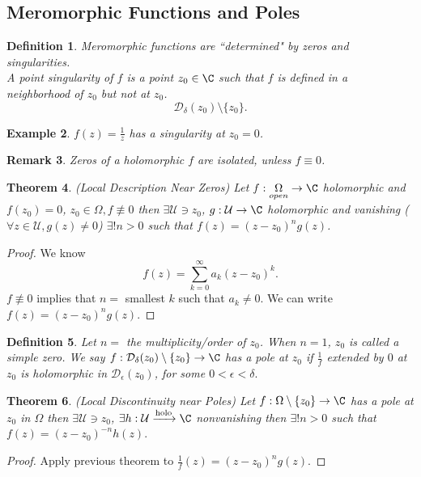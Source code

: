 \documentclass[a4paper]{article}
\newtheorem{thm}{Theorem}[section]
\newtheorem{defn}[thm]{Definition}
\newtheorem{eg}[thm]{Example}
\newtheorem{rmk}[thm]{Remark}
\begin{document}
\subsection{Meromorphic Functions and Poles}
\begin{defn}
    Meromorphic functions are ``determined" by zeros and singularities. \\
    A point singularity of $f$ is a point $z_0\in \C$ such that $f$ is defined in a neighborhood of $z_0$ but not at $z_0$. \[
    \mathcal{D}_\delta(z_0)\setminus \{z_0\}
    .\] 
\end{defn}
\begin{eg}
    $f(z)=\frac{1}{z}$ has a singularity at $z_0=0$.
\end{eg}
\begin{rmk}
    Zeros of a holomorphic $f$ are isolated, unless $f\equiv 0$.
\end{rmk}
\begin{thm}
    (Local Description Near Zeros) Let $f:\underset{open}{\Omega}\to \C$ holomorphic and $f(z_0)=0$, $z_0\in \Omega, f\not \equiv 0$ then $\exists \mathcal{U}\ni z_0$, $g:\mathcal{U}\to \C$ holomorphic and vanishing ($\forall z\in \mathcal{U}, g(z)\neq 0$) $\exists !n>0$ such that $f(z)=(z-z_0)^ng(z)$.   
\end{thm}
\begin{proof}
    We know \[
    f(z)=\sum_{k=0}^\infty a_k(z-z_0)^k
    .\] 
    $f\not \equiv 0$ implies that $n=$ smallest $k$ such that $a_k\neq 0$. We can write $f(z)=(z-z_0)^ng(z)$. 
\end{proof}
\begin{defn}
    Let $n=$ the multiplicity/order of $z_0$. When $n=1$, $z_0$ is called a simple zero. We say $f:\mathcal{D}_\delta(z_0)\setminus \{z_0\}\to \C$ has a pole at $z_0$ if $\frac{1}{f}$ extended by $0$ at $z_0$ is holomorphic in $\mathcal{D}_\epsilon(z_0)$, for some $0<\epsilon<\delta.$ 
\end{defn}
\begin{thm}
    (Local Discontinuity near Poles) Let $f:\Omega\setminus \{z_0\}\to \C$ has a pole at $z_0$ in $\Omega$ then $\exists \mathcal{U}\ni z_0$, $\exists h:\mathcal{U}\xrightarrow{\text{holo}}\C$ nonvanishing then $\exists ! n>0$ such that $f(z)=(z-z_0)^{-n}h(z).$
\end{thm}
\begin{proof}
    Apply previous theorem to $\frac{1}{f}(z)=(z-z_0)^ng(z)$. 
\end{proof}
\end{document}
